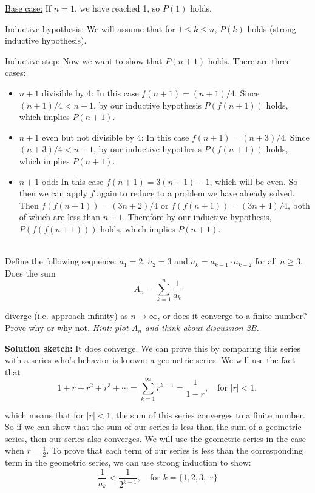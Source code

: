 \documentclass[11pt]{article}
\newif\ifsolutions
\newcommand{\sketch}{\textbf{Solution sketch:}}
\begin{document}
\begin{qunlist}
\underline{Base case:} If $n=1$, we have reached 1, so $P(1)$ holds.

\underline{Inductive hypothesis:} We will assume that for $1 \leq k \leq n$, $P(k)$ holds (strong inductive hypothesis).

\underline{Inductive step:} Now we want to show that $P(n+1)$ holds. There are three cases:

\begin{itemize}
\item $n+1$ divisible by 4: In this case $f(n+1) = (n+1)/4$. Since $(n+1)/4 < n+1$, by our inductive hypothesis $P(f(n+1))$ holds, which implies $P(n+1)$.
\item $n+1$ even but not divisible by 4: In this case $f(n+1) = (n+3)/4$. Since $(n+3)/4 < n+1$, by our inductive hypothesis $P(f(n+1))$ holds, which implies $P(n+1)$.
\item $n+1$ odd: In this case $f(n+1) = 3(n+1) - 1$, which will be even.  So then we can apply $f$ again to reduce to a problem we have already solved.  Then $f(f(n+1)) = (3n+2)/4$ or $f(f(n+1)) = (3n+4)/4$, both of which are less than $n+1$.  Therefore by our inductive hypothesis, $P(f(f(n+1)))$ holds, which implies $P(n+1)$.
\end{itemize}
\fi


 \\
Define the following sequence: $a_1 =2$, $a_2 = 3$ and $a_k = a_{k-1} \cdot a_{k-2}$ for all $n \geq 3$. \\ 
Does the sum 
\[ A_n = \sum_{k=1}^n \frac{1}{a_k} \]

diverge (i.e. approach infinity) as $n \to \infty$, or does it converge to a finite number?  
Prove why or why not.
{\em Hint: plot $A_n$ and think about discussion 2B.}

\ifsolutions
\sketch
It does converge. We can prove this by comparing this series with a series who's behavior is known: a geometric series. We will use the fact that
\[ 1 + r + r^2 + r^3 + \cdots = \sum_{k=1}^{\infty} r^{k-1} = \frac{1}{1-r}, \quad \text{for } |r| < 1, \]

which means that for $|r| < 1$, the sum of this series converges to a finite number. So if we can show that the sum of our series is less than the sum of a geometric series, then our series also converges. We will use the geometric series in the case when $r = \frac{1}{2}$. To prove that each term of our series is less than the corresponding term in the geometric series, we can use strong induction to show:
\[ \frac{1}{a_k} < \frac{1}{2^{k-1}}, \quad \text{for } k = \{1,2,3,\cdots\} \] 


\end{qunlist}
\end{document}
